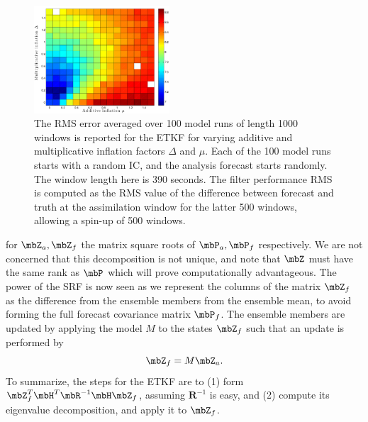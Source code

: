 \begin{figure}[t]
  \centering
  \includegraphics[width=0.45\textwidth]{figures/ETKF_390s_infl_error.pdf}
  \caption[The RMS error averaged over 100 model runs of length 1000 windows is reported for the ETKF for varying additive and multiplicative inflation factors]{
    The RMS error averaged over 100 model runs of length 1000 windows is reported for the ETKF for varying additive and multiplicative inflation factors $\Delta$ and $\mu$.
    Each of the 100 model runs starts with a random IC, and the analysis forecast starts randomly.
    The window length here is 390 seconds.
    The filter performance RMS is computed as the RMS value of the difference between forecast and truth at the assimilation window for the latter 500 windows, allowing a spin-up of 500 windows.
  }
  \label{fig:ETKF_cov_tuning_390s}

\end{figure}

for $\mbZ_a,\mbZ_f$ the matrix square roots of $\mbP_a,\mbP_f$ respectively.
We are not concerned that this decomposition is not unique, and note that $\mbZ$ must have the same rank as $\mbP$ which will prove computationally advantageous.
The power of the SRF is now seen as we represent the columns of the matrix $\mbZ_f$ as the difference from the ensemble members from the ensemble mean, to avoid forming the full forecast covariance matrix $\mbP_f$.
The ensemble members are updated by applying the model $M$ to the states $\mbZ_f$ such that an update is performed by
\begin{equation} \mbZ_f = M \mbZ_a .\end{equation}
To summarize, the steps for the ETKF are to (1) form $\mbZ_f^T\mbH^T\mbR^{-1}\mbH\mbZ_f$, assuming $\mathbf{R}^{-1}$ is easy, and (2) compute its eigenvalue decomposition, and apply it to $\mbZ_f$.

